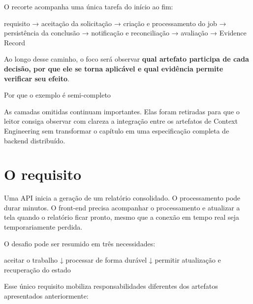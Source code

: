 \documentclass[
  10pt,
  a4paper,
  oneside]{book}
\newenvironment{Shaded}{}{}
\newcommand{\NormalTok}[1]{#1}
\renewenvironment{Shaded}{\begin{snugshade}}{\end{snugshade}}%
\begin{document}
O recorte acompanha uma única tarefa do início ao fim:

\begin{Shaded}
\begin{Highlighting}[]
\NormalTok{requisito}
\NormalTok{→ aceitação da solicitação}
\NormalTok{→ criação e processamento do job}
\NormalTok{→ persistência da conclusão}
\NormalTok{→ notificação e reconciliação}
\NormalTok{→ avaliação}
\NormalTok{→ Evidence Record}
\end{Highlighting}
\end{Shaded}

Ao longo desse caminho, o foco será observar \textbf{qual artefato
participa de cada decisão, por que ele se torna aplicável e qual
evidência permite verificar seu efeito}.

\begin{infobox}{Por que o exemplo é semi-completo}

As camadas omitidas continuam importantes. Elas foram retiradas para que
o leitor consiga observar com clareza a integração entre os artefatos de
Context Engineering sem transformar o capítulo em uma especificação
completa de backend distribuído.

\end{infobox}

\hypertarget{o-requisito}{%
\section{O requisito}\label{o-requisito}}

Uma API inicia a geração de um relatório consolidado. O processamento
pode durar minutos. O front-end precisa acompanhar o processamento e
atualizar a tela quando o relatório ficar pronto, mesmo que a conexão em
tempo real seja temporariamente perdida.

O desafio pode ser resumido em três necessidades:

\begin{Shaded}
\begin{Highlighting}[]
\NormalTok{aceitar o trabalho}
\NormalTok{        ↓}
\NormalTok{processar de forma durável}
\NormalTok{        ↓}
\NormalTok{permitir atualização e recuperação do estado}
\end{Highlighting}
\end{Shaded}

Esse único requisito mobiliza responsabilidades diferentes dos artefatos
apresentados anteriormente:
\end{document}
